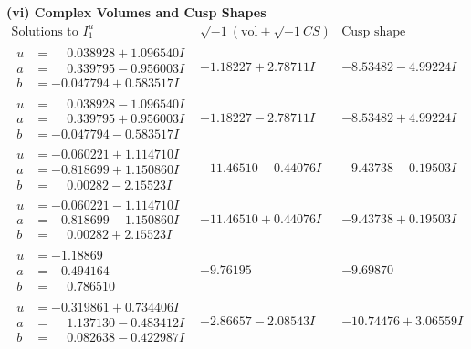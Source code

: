 \documentclass[1p]{elsarticle_modified}
\theoremstyle{definition}
\newcommand{\I}{\sqrt{-1}}
\begin{document}
\newpage\flushleft \textbf{(vi) Complex Volumes and Cusp Shapes}
$$\begin{array}{c|c|c}  
\text{Solutions to }I^u_{1}& \I (\text{vol} + \sqrt{-1}CS) & \text{Cusp shape}\\
 \hline 
\begin{aligned}
u &= \phantom{-}0.038928 + 1.096540 I \\
a &= \phantom{-}0.339795 - 0.956003 I \\
b &= -0.047794 + 0.583517 I\end{aligned}
 & -1.18227 + 2.78711 I & -8.53482 - 4.99224 I \\ \hline\begin{aligned}
u &= \phantom{-}0.038928 - 1.096540 I \\
a &= \phantom{-}0.339795 + 0.956003 I \\
b &= -0.047794 - 0.583517 I\end{aligned}
 & -1.18227 - 2.78711 I & -8.53482 + 4.99224 I \\ \hline\begin{aligned}
u &= -0.060221 + 1.114710 I \\
a &= -0.818699 + 1.150860 I \\
b &= \phantom{-}0.00282 - 2.15523 I\end{aligned}
 & -11.46510 - 0.44076 I & -9.43738 - 0.19503 I \\ \hline\begin{aligned}
u &= -0.060221 - 1.114710 I \\
a &= -0.818699 - 1.150860 I \\
b &= \phantom{-}0.00282 + 2.15523 I\end{aligned}
 & -11.46510 + 0.44076 I & -9.43738 + 0.19503 I \\ \hline\begin{aligned}
u &= -1.18869\phantom{ +0.000000I} \\
a &= -0.494164\phantom{ +0.000000I} \\
b &= \phantom{-}0.786510\phantom{ +0.000000I}\end{aligned}
 & -9.76195\phantom{ +0.000000I} & -9.69870\phantom{ +0.000000I} \\ \hline\begin{aligned}
u &= -0.319861 + 0.734406 I \\
a &= \phantom{-}1.137130 - 0.483412 I \\
b &= \phantom{-}0.082638 - 0.422987 I\end{aligned}
 & -2.86657 - 2.08543 I & -10.74476 + 3.06559 I \\ \hline\begin{aligned}

\end{aligned}
\end{array}$$
\end{document}
